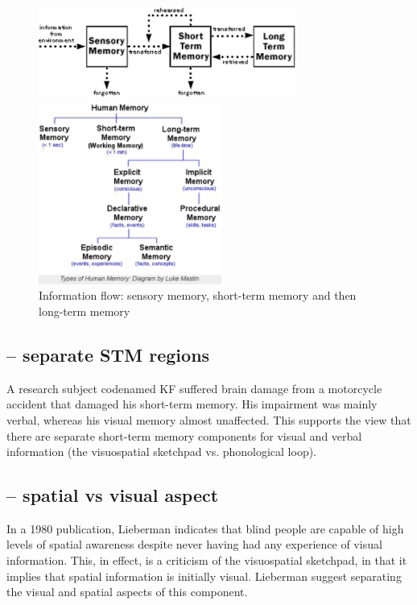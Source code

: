 \begin{figure}[htb]
  \centerline{\includegraphics[height=3cm]{./images/three-box-model.eps}}
  \centerline{\includegraphics[height=6cm]{./images/human-memory.eps}}
  \caption{Information flow: sensory memory,
  short-term memory and then long-term memory}\label{fig:three-box-model}
\end{figure}

\subsection{-- separate STM regions}

A research subject codenamed KF suffered brain damage from a motorcycle accident
that damaged his short-term memory. His impairment was mainly verbal, whereas
his visual memory almost unaffected. This supports the view that there are
separate short-term memory components for visual and verbal information (the
visuospatial sketchpad vs. phonological loop).

\subsection{-- spatial vs visual aspect}

In a 1980 publication, Lieberman indicates that blind people are capable of high
levels of spatial awareness despite never having had any experience of visual
information. This, in effect, is a criticism of the visuospatial sketchpad, in
that it implies that spatial information is initially visual. Lieberman suggest
separating the visual and spatial aspects of this component.

